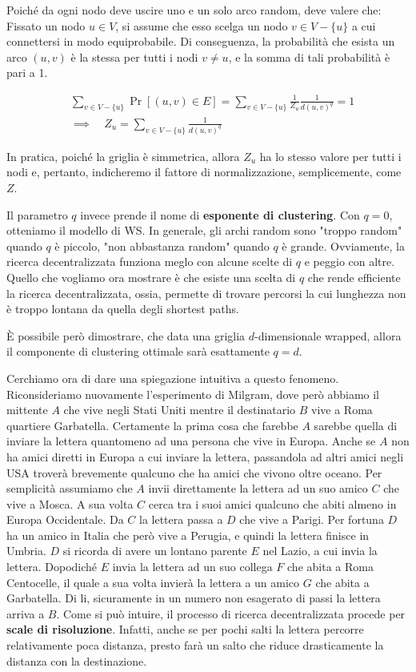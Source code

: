 Poiché da ogni nodo deve uscire uno e un solo arco random, deve valere che:
Fissato un nodo $u \in V$, si assume che esso scelga un nodo $v \in V - \{u\}$ a cui connettersi in modo equiprobabile. Di conseguenza, la probabilità che esista un arco $(u,v)$ è la stessa per tutti i nodi $v \neq u$, e la somma di tali probabilità è pari a 1.

\begin{align*}
&\sum_{v \in V - \{u\}} \Pr[(u, v) \in E] 
    = \sum_{v \in V - \{u\}} \frac{1}{Z_u} \frac{1}{d(u, v)^q} = 1 \\
&\implies\quad 
Z_u = \sum_{v \in V - \{u\}} \frac{1}{d(u, v)^q}
\end{align*}

In pratica, poiché la griglia è simmetrica, allora $Z_u$ ha lo stesso valore per tutti i nodi e, pertanto, indicheremo il fattore di normalizzazione, semplicemente, come $Z$.

Il parametro $q$ invece prende il nome di \textbf{esponente di clustering}. Con $q = 0$, otteniamo il modello di WS. In generale, gli archi random sono "troppo random" quando $q$ è piccolo, "non abbastanza random" quando $q$ è grande. Ovviamente, la ricerca decentralizzata funziona meglo con alcune scelte di $q$ e peggio con altre. Quello che vogliamo ora mostrare è che esiste una scelta di $q$ che rende efficiente la ricerca decentralizzata, ossia, permette di trovare percorsi la cui lunghezza non è troppo lontana da quella
degli shortest paths.

È possibile però dimostrare, che data una griglia $d$-dimensionale wrapped, allora il componente di clustering ottimale sarà esattamente $q = d$.

Cerchiamo ora di dare una spiegazione intuitiva a questo fenomeno.
Riconsideriamo nuovamente l'esperimento di Milgram, dove però abbiamo il mittente $A$ che vive negli Stati Uniti mentre il destinatario $B$ vive a Roma quartiere Garbatella.
Certamente la prima cosa che farebbe $A$ sarebbe quella di inviare la lettera quantomeno ad una persona che vive in Europa.
Anche se $A$ non ha amici diretti in Europa a cui inviare la lettera, passandola ad altri amici negli USA troverà brevemente qualcuno che ha amici che vivono oltre oceano.
Per semplicità assumiamo che $A$ invii direttamente la lettera ad un suo amico $C$ che vive a Mosca.
A sua volta $C$ cerca tra i suoi amici qualcuno che abiti almeno in Europa Occidentale.
Da $C$ la lettera passa a $D$ che vive a Parigi.
Per fortuna $D$ ha un amico in Italia che però vive a Perugia, e quindi la lettera finisce in Umbria. $D$ si ricorda di avere un lontano parente $E$ nel Lazio, a cui invia la lettera.
Dopodiché $E$ invia la lettera ad un suo collega $F$ che abita a Roma Centocelle, il quale a sua volta invierà la lettera a un amico $G$ che abita a Garbatella.
Di li, sicuramente in un numero non esagerato di passi la lettera arriva a $B$.
Come si può intuire, il processo di ricerca decentralizzata procede per \textbf{scale di risoluzione}. Infatti, anche se per pochi salti la lettera percorre relativamente poca distanza, presto farà un salto che riduce drasticamente la distanza con la destinazione.

